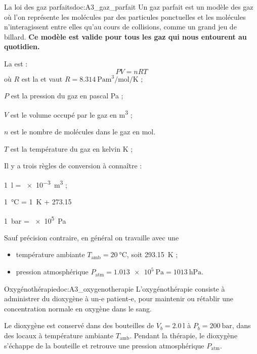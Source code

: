 \begin{doc}{La loi des gaz parfaits}{doc:A3_gaz_parfait}
  Un gaz parfait est un modèle des gaz où l'on représente les molécules par des particules ponctuelles et les molécules n'interagissent entre elles qu'au cours de collisions, comme un grand jeu de billard.
  \textbf{Ce modèle est valide pour tous les gaz qui nous entourent au quotidien.}
  
  \begin{importants}
    La  est :
    \begin{equation*}
      PV = nRT
    \end{equation*}
    où $R$ est la  et vaut $R = \qty{8,314}{\pascal \m\cubed \per\mole \per\kelvin}$ ;
    \begin{listePoints}
      \item $P$ est la pression du gaz en pascal \unit{\pascal} ;
      \item $V$ est le volume occupé par le gaz en \unit{\m\cubed} ;
      \item $n$ est le nombre de molécules dans le gaz en \unit{\mole}.
      \item $T$ est la température du gaz en kelvin \unit{\kelvin} ;
    \end{listePoints}
  \end{importants}

  Il y a trois règles de conversion à connaître :
  \begin{listePoints}
    \item \qty{1}{\litre} = \qty{e-3}{\m\cubed} ;
    \item \qty{1}{\degreeCelsius} = \qty{1}{\kelvin} + \num{273,15}
    \item \qty{1}{\bar} = \qty{e5}{\pascal}
  \end{listePoints}

  Sauf précision contraire, en général on travaille avec une
  \begin{itemize}
    \item température ambiante $T_\text{amb} = \qty{20}{\degreeCelsius}$, soit \qty{293,15}{\kelvin} ;
    \item pression atmosphérique $P_\text{atm} = \qty{1,013e5}{\pascal} = \qty{1013}{\hecto\pascal}$.
  \end{itemize}
  
  
\end{doc}


\begin{doc}{Oxygénothérapie}{doc:A3_oxygenotherapie}
  L'oxygénothérapie consiste à administrer du dioxygène à un-e patient-e, pour maintenir ou rétablir une concentration normale en oxygène dans le sang.

  Le dioxygène est conservé dans des bouteilles de $V_b = \qty{2,0}{\litre}$ à $P_b = \qty{200}{\bar}$, dans des locaux à température ambiante $T_\text{amb}$.
  Pendant la thérapie, le dioxygène s'échappe de la bouteille et retrouve une pression atmosphérique $P_\text{atm}$.
\end{doc}

